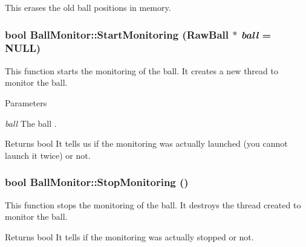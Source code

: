This erases the old ball positions in memory. 

\hypertarget{classBallMonitor_a4d2b3aa764f5d4f4d5f58b7530565f90}{
\subsubsection[{StartMonitoring}]{\setlength{\rightskip}{0pt plus 5cm}bool BallMonitor::StartMonitoring (RawBall $\ast$ {\em ball} = {\ttfamily NULL})}}
\label{classBallMonitor_a4d2b3aa764f5d4f4d5f58b7530565f90}


This function starts the monitoring of the ball. It creates a new thread to monitor the ball. 


\begin{DoxyParams}{Parameters}
\item[{\em ball}]The ball . \end{DoxyParams}
\begin{DoxyReturn}{Returns}
bool It tells us if the monitoring was actually launched (you cannot launch it twice) or not. 
\end{DoxyReturn}
\hypertarget{classBallMonitor_af71db12abeb1f10f7be58eb7591910a3}{
\subsubsection[{StopMonitoring}]{\setlength{\rightskip}{0pt plus 5cm}bool BallMonitor::StopMonitoring ()}}
\label{classBallMonitor_af71db12abeb1f10f7be58eb7591910a3}


This function stops the monitoring of the ball. It destroys the thread created to monitor the ball. 

\begin{DoxyReturn}{Returns}
bool It tells if the monitoring was actually stopped or not. 
\end{DoxyReturn}


